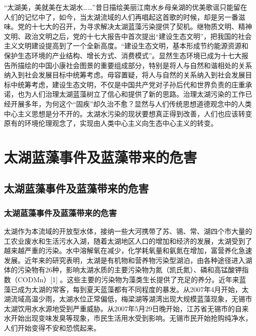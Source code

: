 \documentclass[shorttitle,oneside]{NJUbachelor}
\begin{document}

 “太湖美，美就美在太湖水……”昔日描绘美丽江南水乡母亲湖的优美歌谣只能留在人们的记忆中了，如今，当太湖流域的人们再唱起这首歌的时候，却是另一番滋味。党的十七大的召开，为寻求解决太湖蓝藻污染提供了契机。继物质文明、精神文明、政治文明之后，党的十七大报告中首次提出“建设生态文明”，把我国的社会主义文明建设提高到了一个全新高度。“建设生态文明，基本形成节约能源资源和保护生态环境的产业结构、增长方式、消费模式”。显然生态环境已成为十七大报告所描绘的中国小康社会图景的重要组成部分，特别是将人与自然和谐相处的关系纳入到社会发展目标中统筹考虑。毋容置疑，将人与自然的关系纳入到社会发展目标中统筹考虑，建设生态文明，不仅是中国共产党对子孙后代和世界负责的庄重承诺，也为人们治理太湖蓝藻树立了信心和提供了新的思路。治理太湖污染的工作已经开展多年，为何这个“固疾”却久治不愈？显然与人们传统思想道德观念中的人类中心主义思想是分不开的。太湖水污染的现状要想真正得到改善，人们也应该转变原有的环境伦理观念了，实现由人类中心主义向生态中心主义的转变。

\section{太湖蓝藻事件及蓝藻带来的危害}

\subsection{太湖蓝藻事件及蓝藻带来的危害}

\subsubsection{太湖蓝藻事件及蓝藻带来的危害}

太湖作为本流域的开放型水体，接纳一些大河携带了苏、锡、常、湖四个市大量的工农业废水和生活污水入湖，随着太湖地区人口的增加和经济的发展，太湖受到了越来越严重的污染。水中溶解氧在减少，化学耗氧量和氨氮在增加，富营养化急速发展。近年来的研究表明，太湖是有机物和营养物污染型湖泊，由各种途径进入湖体的污染物有26种，影响太湖水质的主要污染物为氮（凯氏氮）、磷和高锰酸钾指数（CODMn）[1] 。这些主要的污染物为藻类生长提供了充足的养分。近年来蓝藻已成为太湖的常客，每到夏天蓝藻都有不同程度的暴发。从2007年4月开始，太湖流域高温少雨，太湖水位正常偏低，梅梁湖等湖湾出现大规模蓝藻现象，无锡市太湖饮用水水源地受到严重威胁。从2007年5月29日晚开始，江苏省无锡市的自来水开始出现变味发臭等现象，市民生活用水受到影响。无锡市民开始抢购纯净水，人们开始变得不安和恐慌起来。

\newpage
\end{document}
